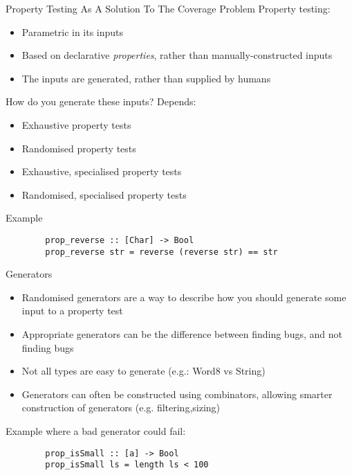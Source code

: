     \begin{frame}{Property Testing As A Solution To The Coverage Problem}
        Property testing:
            \begin{itemize}
                \item Parametric in its inputs
                \item Based on declarative \textit{properties}, rather than manually-constructed inputs
                \item The inputs are generated, rather than supplied by humans
            \end{itemize}
        
        How do you generate these inputs? Depends:
            \begin{itemize}
                \item Exhaustive property tests
                \item Randomised property tests
                \item Exhaustive, specialised property tests
                \item Randomised, specialised property tests
            \end{itemize}
    \end{frame}

    \begin{frame}[fragile]{Example}
        \begin{verbatim}
        prop_reverse :: [Char] -> Bool
        prop_reverse str = reverse (reverse str) == str
        \end{verbatim}       
    \end{frame}

    \begin{frame}[fragile]{Generators}
        \begin{itemize}
            \item Randomised generators are a way to describe how you should generate some input to a property test
            \item Appropriate generators can be the difference between finding bugs, and not finding bugs
            \item Not all types are easy to generate (e.g.: Word8 vs String)
            \item Generators can often be constructed using combinators, allowing smarter construction of generators (e.g. filtering,sizing)
        \end{itemize} 
        
        Example where a bad generator could fail:
        \begin{verbatim}
        prop_isSmall :: [a] -> Bool
        prop_isSmall ls = length ls < 100
        \end{verbatim}
    \end{frame}
   
